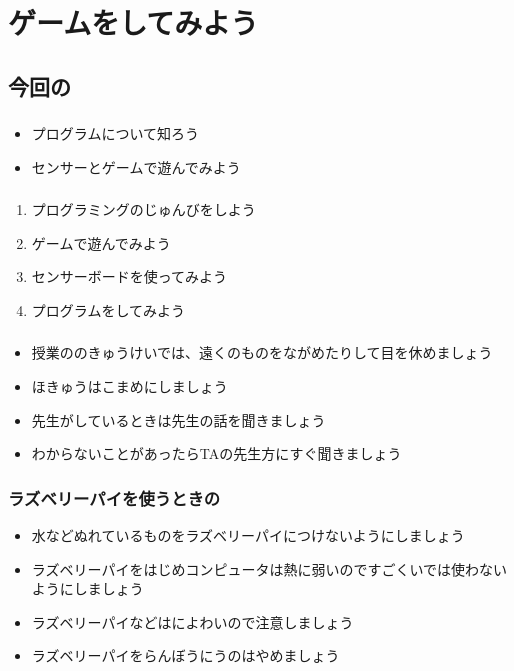 \chapter{ゲームをしてみよう}
\section{今回の}
\subsection{}
\begin{itemize}
  \item プログラムについて知ろう
  \item センサーとゲームで遊んでみよう
\end{itemize}

\subsection{}
\begin{enumerate}
  \item プログラミングのじゅんびをしよう
  \item ゲームで遊んでみよう
  \item センサーボードを使ってみよう
  \item プログラムをしてみよう
\end{enumerate}

\subsection{}
\begin{itemize}
  \item 授業ののきゅうけいでは、遠くのものをながめたりして目を休めましょう
  \item {}ほきゅうはこまめにしましょう
  \item 先生がしているときは先生の話を聞きましょう
  \item わからないことがあったらTAの先生方にすぐ聞きましょう
\end{itemize}

\subsection{ラズベリーパイを使うときの}
\begin{itemize}
  \item 水などぬれているものをラズベリーパイにつけないようにしましょう
  \item ラズベリーパイをはじめコンピュータは熱に弱いのですごくいでは使わないようにしましょう
  \item ラズベリーパイなどはによわいので注意しましょう
  \item ラズベリーパイをらんぼうにうのはやめましょう
\end{itemize}
\clearpage


